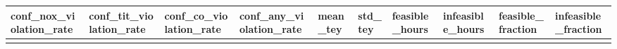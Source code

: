 \documentclass[11pt]{article}
\newcounter{none} %
\begin{document}
{\def\LTcaptype{none} %
\begin{longtable}[]{@{}
  >{\raggedleft\arraybackslash}p{}
  >{\raggedleft\arraybackslash}p{}
  >{\raggedright\arraybackslash}p{}
  >{\raggedright\arraybackslash}p{}
  >{\raggedright\arraybackslash}p{}
  >{\raggedleft\arraybackslash}p{}
  >{\raggedleft\arraybackslash}p{}
  >{\raggedleft\arraybackslash}p{}
  >{\raggedright\arraybackslash}p{}
  >{\raggedleft\arraybackslash}p{}@{}}
\toprule\noalign{}
\begin{minipage}[b]{\linewidth}\raggedleft
conf\_nox\_violation\_rate
\end{minipage} & \begin{minipage}[b]{\linewidth}\raggedleft
conf\_tit\_violation\_rate
\end{minipage} & \begin{minipage}[b]{\linewidth}\raggedright
conf\_co\_violation\_rate
\end{minipage} & \begin{minipage}[b]{\linewidth}\raggedright
conf\_any\_violation\_rate
\end{minipage} & \begin{minipage}[b]{\linewidth}\raggedright
mean\_tey
\end{minipage} & \begin{minipage}[b]{\linewidth}\raggedleft
std\_tey
\end{minipage} & \begin{minipage}[b]{\linewidth}\raggedleft
feasible\_hours
\end{minipage} & \begin{minipage}[b]{\linewidth}\raggedleft
infeasible\_hours
\end{minipage} & \begin{minipage}[b]{\linewidth}\raggedright
feasible\_fraction
\end{minipage} & \begin{minipage}[b]{\linewidth}\raggedleft
infeasible\_fraction
\end{minipage} \\
\midrule\noalign{}
\endhead
\bottomrule\noalign{}

\end{longtable}}
\end{document}
